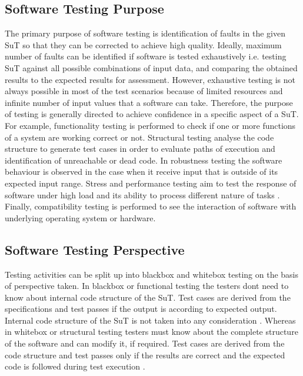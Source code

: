 \subsection{Software Testing Purpose}
The primary purpose of software testing is identification of faults in the given SuT so that they can be corrected to achieve high quality. Ideally, maximum number of faults can be identified if software is tested exhaustively i.e. testing SuT against all possible combinations of input data, and comparing the obtained results to the expected results for assessment. However, exhaustive testing is not always possible in most of the test scenarios because of limited resources and infinite number of input values that a software can take. Therefore, the purpose of testing is generally directed to achieve confidence in a specific aspect of a SuT. For example, functionality testing is performed to check if one or more functions of a system are working correct or not. Structural testing analyse the code structure to generate test cases in order to evaluate paths of execution and identification of unreachable or dead code.  In robustness testing the software behaviour is observed in the case when it receive input that is outside of its expected input range.  Stress and performance testing aim to test the response of software under high load and its ability to process different nature of tasks \cite{cohen2005robustness}. Finally, compatibility testing is performed to see the interaction of software with underlying operating system or hardware.

\subsection{Software Testing Perspective}
Testing activities can be split up into blackbox and whitebox testing on the basis of perspective taken. In blackbox or functional testing the testers dont need to know about internal code structure of the SuT. Test cases are derived from the specifications and test passes if the output is according to expected output. Internal code structure of the SuT is not taken into any consideration \cite{beizer1995black}. Whereas in whitebox or structural testing testers must know about the complete structure of the software and can modify it, if required. Test cases are derived from the code structure and test passes only if the results are correct and the expected code is followed during test execution \cite{ostrand2002white}.

